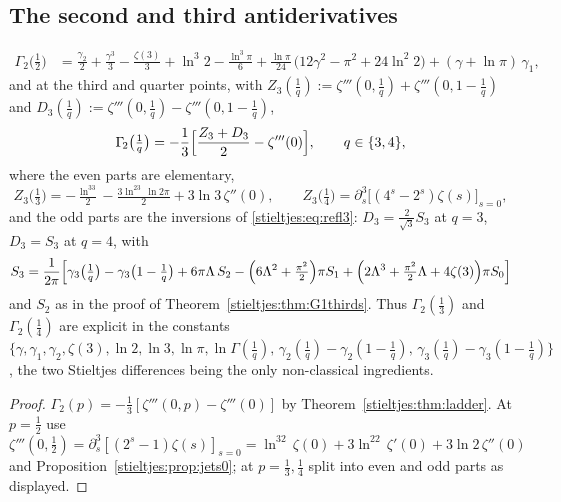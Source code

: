 \subsection{The second and third antiderivatives}

\begin{theorem}\label{stieltjes:thm:G2}
\begin{align*}
\Gamma_{\!2}\bigl(\tfrac12\bigr)
&=\frac{\gamma_{2}}{2}+\frac{\gamma^{3}}{3}-\frac{\zeta(3)}{3}+\ln ^{3}2
-\frac{\ln ^{3}\pi}{6}
+\frac{\ln \pi}{24}\,\bigl(12 \gamma^{2}-\pi^{2}+24 \ln ^{2}2\bigr)
+(\gamma+\ln \pi)\,\gamma_{1},
\end{align*}
and at the third and quarter points, with
$Z_3(\tfrac1q):=\zeta'''(0,\tfrac1q)+\zeta'''(0,1-\tfrac1q)$ and
$D_3(\tfrac1q):=\zeta'''(0,\tfrac1q)-\zeta'''(0,1-\tfrac1q)$,
\[
\Gamma_{\!2}\bigl(\tfrac1q\bigr)
=-\frac13\Bigl[\frac{Z_3+D_3}{2}-\zeta'''(0)\Bigr],
\qquad q\in\{3,4\},
\]
where the even parts are elementary,
\[
Z_3\bigl(\tfrac13\bigr)=-\tfrac{\ln^33}{2}-\tfrac{3\ln^23\,\ln2\pi}{2}+3\ln3\,\zeta''(0),
\qquad
Z_3\bigl(\tfrac14\bigr)=\partial_s^3\bigl[(4^s-2^s)\zeta(s)\bigr]_{s=0},
\]
and the odd parts are the inversions of \eqref{stieltjes:eq:refl3}:
$D_3=\frac{2}{\sqrt3}S_3$ at $q=3$, $D_3=S_3$ at $q=4$, with
\[
S_3=\frac{1}{2\pi}\Bigl[\gamma_3\bigl(\tfrac1q\bigr)-\gamma_3\bigl(1-\tfrac1q\bigr)
+6\pi \Lambda\,S_2-\Bigl(6\Lambda^2+\tfrac{\pi^2}{2}\Bigr)\pi S_1
+\Bigl(2\Lambda^3+\tfrac{\pi^2}{2}\Lambda+4\zeta(3)\Bigr)\pi S_0\Bigr]
\]
and $S_2$ as in the proof of Theorem~\ref{stieltjes:thm:G1thirds}. Thus
$\Gamma_{\!2}(\tfrac13)$ and $\Gamma_{\!2}(\tfrac14)$ are explicit in the
constants
$\bigl\{\gamma,\gamma_1,\gamma_2,\zeta(3),\ln2,\ln3,\ln\pi,
\ln\Gamma(\tfrac1q),\,
\gamma_2(\tfrac1q)-\gamma_2(1-\tfrac1q),\,
\gamma_3(\tfrac1q)-\gamma_3(1-\tfrac1q)\bigr\}$,
the two Stieltjes differences being the only non-classical ingredients.
\end{theorem}

\begin{proof}
$\Gamma_{\!2}(p)=-\tfrac13[\zeta'''(0,p)-\zeta'''(0)]$ by
Theorem~\ref{stieltjes:thm:ladder}. At $p=\tfrac12$ use
$\zeta'''(0,\tfrac12)=\partial_s^3[(2^s-1)\zeta(s)]_{s=0}
=\ln^32\,\zeta(0)+3\ln^22\,\zeta'(0)+3\ln2\,\zeta''(0)$ and
Proposition~\ref{stieltjes:prop:jets0}; at $p=\tfrac13,\tfrac14$ split into even and
odd parts as displayed.
\end{proof}

